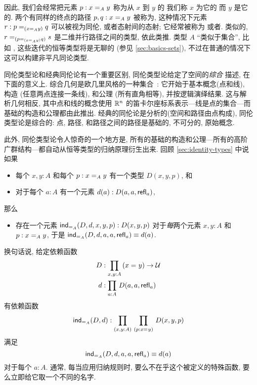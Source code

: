 因此, 我们会经常把元素 $p : \id[A]{x}{y}$ 称为从 $x$ 到 $y$ 的 
我们称 $x$ 为它的 
而 $y$ 是它的. 
两个有同样的终点的路径 $p,q : \id[A]{x}{y}$ 被称为, 
这种情况下元素 $r : \id[{(\id[A]{x}{y})}]{p}{q}$ 可以被视为同伦, 或者态射间的态射; 它经常被称为 %
或者. %
%
类似的, $\id[{(\id[{(\id[A]{x}{y})}]{p}{q})}]{r}{s}$ 是二维并行路径之间的类型,
%
依此类推. 类型 $A$ ``类似于集合'', 比如 \nat, 这些迭代的恒等类型将是无聊的 (参见 \cref{sec:basics-sets}), 不过在普通的情况下这可以构建非平凡同论类型. 


同伦类型论和经典同伦论有一个重要区别, 同伦类型论给定了空间的\emph{综合}%
%
%
描述, 在下面的意义上. 综合几何是欧几里风格的一种集合~\cite{Euclid}: 它开始于基本概念(点和线), 构造 (任意两点连接一条线), 和公理 (所有直角相等), 并按逻辑演绎结果. 这与解析几何相反,%
其中点和线的概念使用 $\R^n$ 的笛卡尔座标系表示---线是点的集合---而基础的构造和公理都由此推出. 经典的同伦论是分析的(空间和路径由点构成), 同伦类型论是综合的: 点, 路径, 和路径之间的路径是基础的, 不可分的, 原始概念. 

此外, 同伦类型论令人惊奇的一个地方是, 所有的基础的构造和公理---所有的高阶广群结构---都自动从恒等类型的归纳原理衍生出来. 回顾 \cref{sec:identity-types} 中说如果 \begin{itemize}
\item 每个 $x,y:A$ 和每个 $p:\id[A]xy$ 有一个类型 $D(x,y,p)$, 和
\item 对于每个 $a:A$ 有一个元素 $d(a):D(a,a,\refl a)$,
\end{itemize}
那么 \begin{itemize}
\item 存在一个元素 $\indid{A}(D,d,x,y,p):D(x,y,p)$ 对于\emph{每}两个元素 $x,y:A$ 和 $p:\id[A]xy$, 于是 $\indid{A}(D,d,a,a,\refl a) \jdeq d(a)$.
\end{itemize}
换句话说, 给定依赖函数 \begin{align*}
D &:\prd{x,y:A} (\id{x}{y}) \to \type\\
d &:\prd{a:A} D(a,a,\refl{a})
\end{align*}
有依赖函数 \[\indid{A}(D,d):\prd{x,y:A}{p:\id{x}{y}} D(x,y,p)\]
满足 \begin{equation}\label{eq:Jconv}
\indid{A}(D,d,a,a,\refl{a})\jdeq d(a)
\end{equation}
对于每个 $a:A$. 通常, 每当应用归纳规则时, 要么不在乎这个被定义的特殊函数, 要么立即给它取一个不同的名字. 


